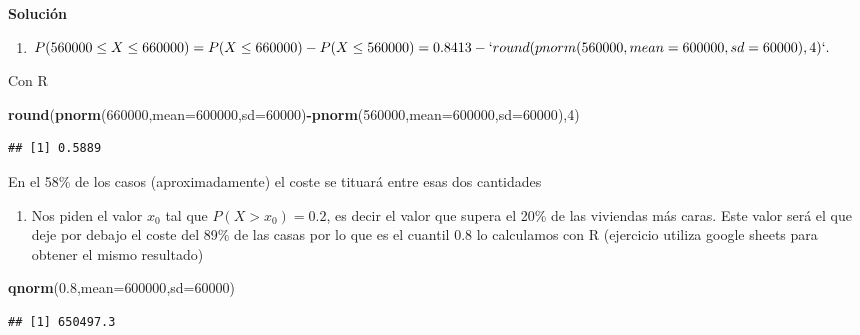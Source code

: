 \documentclass[
]{article}
\newenvironment{Shaded}{\begin{snugshade}}{\end{snugshade}}
\newcommand{\DataTypeTok}[1]{\textcolor[rgb]{0.13,0.29,0.53}{#1}}
\newcommand{\DecValTok}[1]{\textcolor[rgb]{0.00,0.00,0.81}{#1}}
\newcommand{\FloatTok}[1]{\textcolor[rgb]{0.00,0.00,0.81}{#1}}
\newcommand{\KeywordTok}[1]{\textcolor[rgb]{0.13,0.29,0.53}{\textbf{#1}}}
\newcommand{\NormalTok}[1]{#1}
\newcommand{\OperatorTok}[1]{\textcolor[rgb]{0.81,0.36,0.00}{\textbf{#1}}}
\providecommand{\tightlist}{%
  \setlength{\itemsep}{0pt}\setlength{\parskip}{0pt}}
\begin{document}
\textbf{Solución}

\begin{enumerate}
\def\labelenumi{\alph{enumi}.}
\tightlist
\item
  \(P(560000\leq X\leq 660000)=P(X\leq 660000)-P(X\leq 560000)=0.8413-`round(pnorm(560000,mean=600000,sd=60000),4)`.\)
\end{enumerate}

Con R

\begin{Shaded}
\begin{Highlighting}[]
\KeywordTok{round}\NormalTok{(}\KeywordTok{pnorm}\NormalTok{(}\DecValTok{660000}\NormalTok{,}\DataTypeTok{mean=}\DecValTok{600000}\NormalTok{,}\DataTypeTok{sd=}\DecValTok{60000}\NormalTok{)}\OperatorTok{{-}}\KeywordTok{pnorm}\NormalTok{(}\DecValTok{560000}\NormalTok{,}\DataTypeTok{mean=}\DecValTok{600000}\NormalTok{,}\DataTypeTok{sd=}\DecValTok{60000}\NormalTok{),}\DecValTok{4}\NormalTok{)}
\end{Highlighting}
\end{Shaded}

\begin{verbatim}
## [1] 0.5889
\end{verbatim}

En el 58\% de los casos (aproximadamente) el coste se tituará entre esas
dos cantidades

\begin{enumerate}
\def\labelenumi{\alph{enumi}.}
\setcounter{enumi}{1}
\tightlist
\item
  Nos piden el valor \(x_0\) tal que \(P(X>x_0)=0.2\), es decir el valor
  que supera el 20\% de las viviendas más caras. Este valor será el que
  deje por debajo el coste del 89\% de las casas por lo que es el
  cuantil 0.8 lo calculamos con R (ejercicio utiliza google sheets para
  obtener el mismo resultado)
\end{enumerate}

\begin{Shaded}
\begin{Highlighting}[]
\KeywordTok{qnorm}\NormalTok{(}\FloatTok{0.8}\NormalTok{,}\DataTypeTok{mean=}\DecValTok{600000}\NormalTok{,}\DataTypeTok{sd=}\DecValTok{60000}\NormalTok{)}
\end{Highlighting}
\end{Shaded}

\begin{verbatim}
## [1] 650497.3
\end{verbatim}
\end{document}
